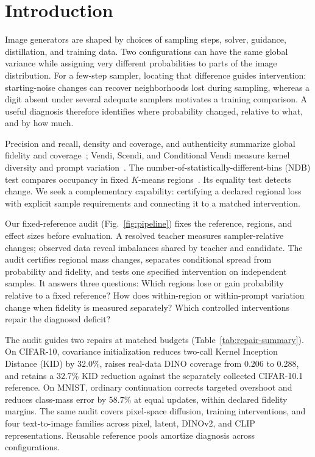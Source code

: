 \section{Introduction}
\label{sec:intro}
Image generators are shaped by choices of sampling steps, solver,
guidance, distillation, and training data. Two configurations can have
the same global variance while assigning very different probabilities
to parts of the image distribution. For a few-step sampler, locating
that difference guides intervention: starting-noise changes can recover
neighborhoods lost during sampling, whereas a digit absent under several
adequate samplers motivates a training comparison. A useful diagnosis
therefore identifies where probability changed, relative to what, and
by how much.

Precision and recall, density and coverage, and authenticity summarize
global fidelity and coverage~\cite{kynkaanniemi2019improved,naeem2020density,alaa2022faithful};
Vendi, Scendi, and Conditional Vendi measure kernel diversity and prompt
variation~\cite{friedman2023vendi,ospanov2025scendi,jalali2026conditional}.
The number-of-statistically-different-bins (NDB) test compares occupancy
in fixed $K$-means regions~\cite{richardson2018ndb}. Its equality test
detects change. We seek a complementary capability: certifying a declared
regional loss with explicit sample requirements and connecting it to a
matched intervention.

Our fixed-reference audit (Fig.~\ref{fig:pipeline}) fixes the reference,
regions, and effect sizes before evaluation. A resolved teacher measures
sampler-relative changes; observed data reveal imbalances shared by
teacher and candidate. The audit certifies regional mass changes,
separates conditional spread from probability and fidelity, and tests one
specified intervention on independent samples. It answers three questions:
Which regions lose or gain probability relative to a fixed reference?
How does within-region or within-prompt variation change when fidelity
is measured separately? Which controlled interventions repair the
diagnosed deficit?

The audit guides two repairs at matched budgets
(Table~\ref{tab:repair-summary}). On CIFAR-10, covariance initialization
reduces two-call Kernel Inception Distance (KID) by 32.0\%, raises
real-data DINO coverage from 0.206 to 0.288, and retains a 32.7\% KID
reduction against the separately collected CIFAR-10.1 reference.
On MNIST, ordinary continuation corrects targeted overshoot and reduces
class-mass error by 58.7\% at equal updates, within declared fidelity
margins. The same audit covers pixel-space diffusion, training
interventions, and four text-to-image families across pixel, latent,
DINOv2, and CLIP representations. Reusable reference pools amortize
diagnosis across configurations.


